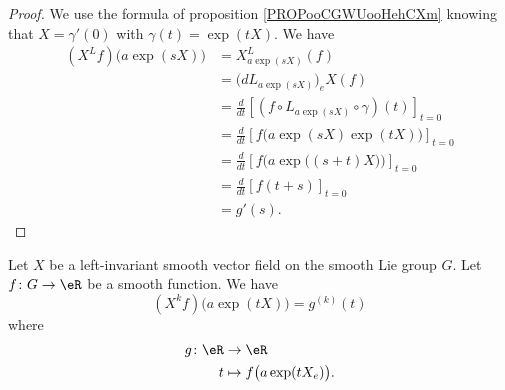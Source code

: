 \begin{proof}
	We use the formula of proposition \ref{PROPooCGWUooHehCXm} knowing that \( X=\gamma'(0)\) with \( \gamma(t)=\exp(tX)\). We have
	\begin{subequations}
		\begin{align}
			(X^Lf)\big( a\exp(sX) \big) & =X^L_{a\exp(sX)}(f)                                                       \\
			                            & =\big( dL_{a\exp(sX)} \big)_eX(f)                                         \\
			                            & =\frac{d}{dt} \left[ (f\circ L_{a\exp(sX)}\circ \gamma)(t)  \right]_{t=0} \\
			                            & =\frac{d}{dt} \left[ f\big( a\exp(sX)\exp(tX) \big)  \right]_{t=0}        \\
			                            & =\frac{d}{dt} \left[ f\Big( a\exp\big( (s+t)X \big) \Big)  \right]_{t=0}  \\
			                            & =\frac{d}{dt} \left[ f(t+s)  \right]_{t=0}                                \\
			                            & =g'(s).
		\end{align}
	\end{subequations}
\end{proof}

\begin{proposition}	\label{PROPooPEKNooUAeMjp}
	Let \( X\) be a left-invariant smooth vector field on the smooth Lie group \( G\). Let \(f \colon G\to \eR  \) be a smooth function. We have
	\begin{equation}
		(X^kf)\big( a\exp(tX) \big)=g^{(k)}(t)
	\end{equation}
	where
	\begin{equation}
		\begin{aligned}
			g\colon \eR & \to \eR                              \\
			t           & \mapsto    f\big( a\exp(tX_e) \big).
		\end{aligned}
	\end{equation}
\end{proposition}

